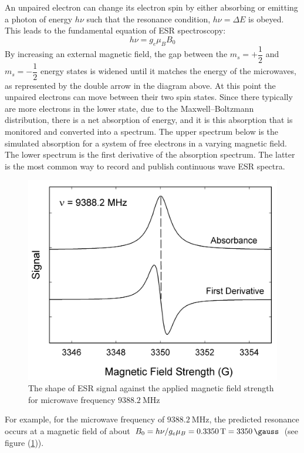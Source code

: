 \documentclass[%
 reprint,
nofootinbib,
 amsmath,amssymb,
 aps,
floatfix,
]{revtex4-2}
\begin{document}
    An unpaired electron can change its electron spin by either absorbing or emitting a photon of energy $h \nu$ such that the resonance condition, $h \nu = \Delta E$ is obeyed. This leads to the fundamental equation of ESR spectroscopy:
    \begin{equation}
        h \nu = g_e \mu_B B_0
    \end{equation}
    By increasing an external magnetic field, the gap between the $m_s = + \dfrac{1}{2}$ and $m_s = - \dfrac{1}{2}$ energy states is widened until it matches the energy of the microwaves, as represented by the double arrow in the diagram above. At this point the unpaired electrons can move between their two spin states. Since there typically are more electrons in the lower state, due to the Maxwell–Boltzmann distribution, there is a net absorption of energy, and it is this absorption that is monitored and converted into a spectrum. The upper spectrum below is the simulated absorption for a system of free electrons in a varying magnetic field. The lower spectrum is the first derivative of the absorption spectrum. The latter is the most common way to record and publish continuous wave ESR spectra.
    \begin{figure}
        \centering
        \includegraphics[scale = 0.1]{Figures/EPR_lines.png}
        \caption{The shape of ESR signal against the applied magnetic field strength for microwave frequency $\SI{9388.2}{\mega \hertz}$}
        \label{fig:ESRline}
    \end{figure}
    For example, for the microwave frequency of $\SI{9388.2}{\mega \hertz}$, the predicted resonance occurs at a magnetic field of about $B_0 = h \nu / g_e \mu_B = \SI{0.3350}{\tesla} = \SI{3350}{\gauss}$ (see figure (\ref{fig:ESRline})).
\end{document}
